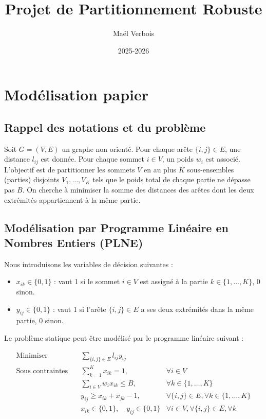 \documentclass{article}
\title{Projet de Partitionnement Robuste}
\author{Maël Verbois}
\date{2025-2026}
\begin{document}
\maketitle
\section{Modélisation papier}
\subsection{Rappel des notations et du problème}

Soit $G=(V,E)$ un graphe non orienté. Pour chaque arête $\{i,j\} \in E$, une distance $l_{ij}$ est donnée. Pour chaque sommet $i \in V$, un poids $w_i$ est associé.
L'objectif est de partitionner les sommets $V$ en au plus $K$ sous-ensembles (parties) disjoints $V_1, \dots, V_K$ tels que le poids total de chaque partie ne dépasse pas $B$. On cherche à minimiser la somme des distances des arêtes dont les deux extrémités appartiennent à la même partie.

\subsection{Modélisation par Programme Linéaire en Nombres Entiers (PLNE)}

Nous introduisons les variables de décision suivantes :
\begin{itemize}
    \item $x_{ik} \in \{0,1\}$ : vaut 1 si le sommet $i \in V$ est assigné à la partie $k \in \{1, \dots, K\}$, 0 sinon.
    \item $y_{ij} \in \{0,1\}$ : vaut 1 si l'arête $\{i,j\} \in E$ a ses deux extrémités dans la même partie, 0 sinon.
\end{itemize}

Le problème statique peut être modélisé par le programme linéaire suivant :

\begin{align}
    \text{Minimiser} \quad & \sum_{\{i,j\} \in E} l_{ij} y_{ij} \label{obj:static} \\
    \text{Sous contraintes} \quad & \sum_{k=1}^{K} x_{ik} = 1, & \forall i \in V \label{const:assign} \\
    & \sum_{i \in V} w_i x_{ik} \le B, & \forall k \in \{1, \dots, K\} \label{const:capacity} \\
    & y_{ij} \ge x_{ik} + x_{jk} - 1, & \forall \{i,j\} \in E, \forall k \in \{1, \dots, K\} \label{const:link} \\
    & x_{ik} \in \{0,1\}, \quad y_{ij} \in \{0,1\} & \forall i \in V, \forall \{i,j\} \in E, \forall k \label{const:integrality}
\end{align}
\end{document}
